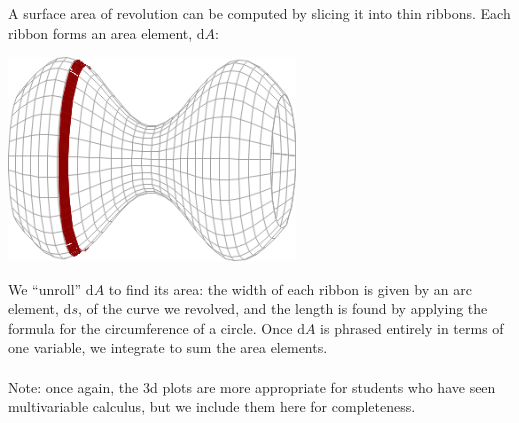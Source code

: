 \documentclass[10.5pt,twoside]{report}
\theoremstyle{definition}
\begin{document}
A surface area of revolution can be computed by slicing it into thin ribbons.  Each ribbon forms an area element, $\mathrm{d}A$:\\

\begin{center}
\includegraphics[width=3in]{figure_3_4_1}
\end{center}

We ``unroll'' $\mathrm{d}A$ to find its area:  the width of each ribbon is given by an arc element, $\mathrm{d}s$, of the curve we revolved, and the length is found by applying the formula for the circumference of a circle.  Once $\mathrm{d}A$ is phrased entirely in terms  of one variable, we integrate to sum the area elements.\\
${}$\\
Note:  once again, the 3d plots are more appropriate for students who have seen multivariable calculus, but we include them here for completeness.
\end{document}
